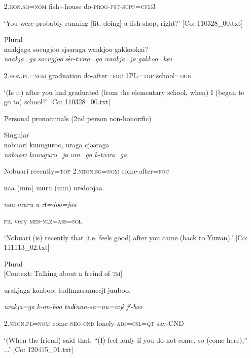       2.\textsc{hon}.\textsc{sg}=\textsc{nom}  fish+house  do-\textsc{prog}-\textsc{pst}-\textsc{supp}=\textsc{cfm}3

\glt ‘You were probably running [lit. doing] a fish shop, right?’ [Co: 110328\_00.txt]
\z

 \ex Plural\\
{\TM}
\gll  naakjaga  {\textbar}socugjoo{\textbar}  sjəəraga  waakjoo  {\textbar}gakkoo{\textbar}kai?\\

      \textit{naakja=ga}  \textit{socugjoo}  \textit{sɨr-təəra=ga}  \textit{waakja=ja}  \textit{gakkoo=kai}

      2.\textsc{hon}.\textsc{pl}=\textsc{nom}  graduation  do-after=\textsc{foc}  1PL=\textsc{top}  school=\textsc{dub}

\glt ‘(Is it) after you had graduated (from the elementary school, when) I (began to go to) school?’ [Co: 110328\_00.txt]
\z

  Personal pronominals (2nd person non-honorific)

 \ex Singular\\
{\TM}
\gll  nobuari  kunuguroo,  uraga  cjəəraga\\

      \textit{nobuari}  \textit{kunuguru=ja}  \textit{ura=ga}  \textit{k-təəra=ga}

      Nobuari  recently=\textsc{top}  2.\textsc{nhon}.\textsc{sg}=\textsc{nom}  come-after=\textsc{foc}

      naa  (mm)  muru  (mm)  urɨdoojaa.

      \textit{naa}    \textit{muru}    \textit{u-rɨ=doo=jaa}

      \textsc{fil}    very    \textsc{mes}-\textsc{nlz}=\textsc{ass}=\textsc{sol}

\glt ‘Nobuari (is) recently that [i.e. feels good] after you came (back to Yuwan).’ [Co: 111113\_02.txt]
\z

\ex  Plural\\

    [Context: Talking about a freind of \textsc{tm}]

{\TM}
\gll urakjaga  konboo,  tudɨnnasanuccjɨ  juuboo,

      \textit{urakja=ga}  \textit{k-on-boo}  \textit{tudɨnna-sa=nu=ccjɨ}  \textit{jˀ-boo}

      2.\textsc{nhon}.\textsc{pl}=\textsc{nom}  come-\textsc{neg}-\textsc{cnd}  lonely-\textsc{adj}=\textsc{csl}=\textsc{qt}  say-CND

\glt ‘(When the friend) said that, “(I) feel lonly if you do not come, so (come here),” ...’ [Co: 120415\_01.txt]
\z

